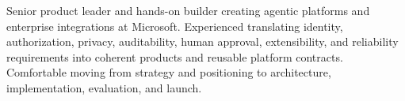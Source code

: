 

\begin{cvparagraph}

Senior product leader and hands-on builder creating agentic platforms and enterprise integrations at Microsoft. Experienced translating identity, authorization, privacy, auditability, human approval, extensibility, and reliability requirements into coherent products and reusable platform contracts. Comfortable moving from strategy and positioning to architecture, implementation, evaluation, and launch.
\end{cvparagraph}
